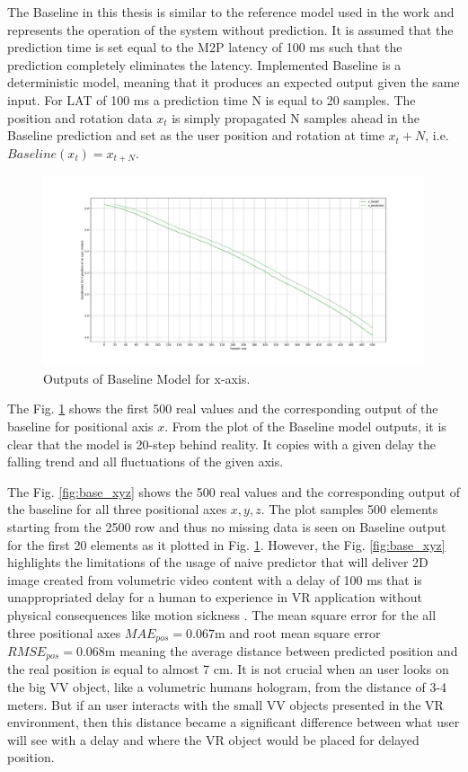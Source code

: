 The Baseline in this thesis is similar to the reference model used in the work \cite{serhan_kalman} and represents the operation of the system without prediction. It is assumed that the prediction time is set equal to the M2P latency of 100 ms such that the prediction completely eliminates the latency. Implemented Baseline is a deterministic model, meaning that it produces an expected output given the same input. For LAT of 100 ms a prediction time N is equal to 20 samples. The position and rotation data $x_t$ is simply propagated N samples ahead in the Baseline prediction and set as the user position and rotation at time $x_t + N$, i.e. $Baseline(x_t) = x_{t+N}$. 
\begin{figure}[htb]
	\begin{center}
		\includegraphics[width=1\textwidth, keepaspectratio]{gfx/base_zoom-x.pdf}
		\caption{\label{fig:base_x} Outputs of Baseline Model for x-axis.}
	\end{center}
\end{figure}

The Fig. \ref{fig:base_x} shows the first 500 real values and the corresponding output of the baseline for positional axis $x$. From the plot of the Baseline model outputs, it is clear that the model is 20-step behind reality. It copies with a given delay the falling trend and all fluctuations of the given axis.

The Fig. \ref{fig:base_xyz} shows the 500 real values and the corresponding output of the baseline for all three positional axes $x, y, z$. The plot samples 500 elements starting from the 2500 row and thus no missing data is seen on Baseline output for the first 20 elements as it plotted in Fig. \ref{fig:base_x}. However, the Fig. \ref{fig:base_xyz} highlights the limitations of the usage of naive predictor that will deliver 2D image created from volumetric video content with a delay of 100 ms that is unappropriated delay for a human to experience in VR application without physical consequences like motion sickness \cite{delay_sickness}. The mean square error for the all three positional axes $MAE_{pos} = 0.067$m and root mean square error  $RMSE_{pos} = 0.068$m meaning the average distance between predicted position and the real position is equal to almost 7 cm. It is not crucial when an user looks on the big VV object, like a volumetric humans hologram, from the distance of 3-4 meters. But if an user interacts with the small VV objects presented in the VR environment, then this distance became a significant difference between what user will see with a delay and where the VR object would be placed for delayed position. 

